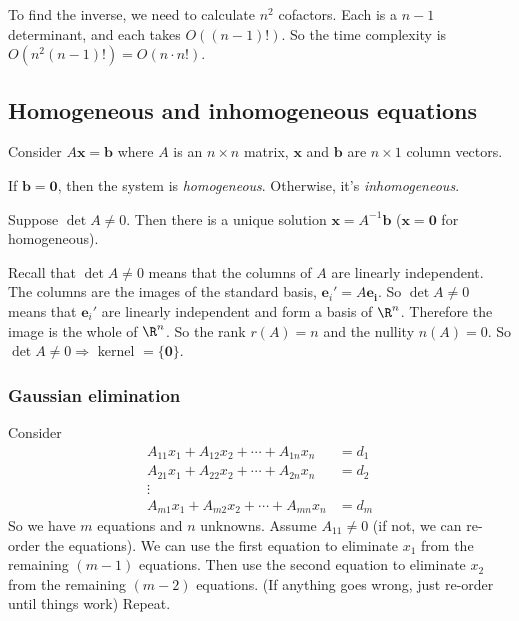 \documentclass[a4paper]{article}
\begin{document}
To find the inverse, we need to calculate $n^2$ cofactors. Each is a $n -1$ determinant, and each takes $O((n - 1)!)$. So the time complexity is $O(n^2 (n - 1)!) = O(n\cdot n!)$.

\subsection{Homogeneous and inhomogeneous equations}
Consider $A\mathbf{x} = \mathbf{b}$ where $A$ is an $n\times n$ matrix, $\mathbf{x}$ and $\mathbf{b}$ are $n\times 1$ column vectors.
\begin{defi}
  If $\mathbf{b} = \mathbf{0}$, then the system is \emph{homogeneous}. Otherwise, it's \emph{inhomogeneous}.
\end{defi}

Suppose $\det A\not= 0$. Then there is a unique solution $\mathbf{x} = A^{-1}\mathbf{b}$ ($\mathbf{x} = \mathbf{0}$ for homogeneous).

\note Recall that $\det A\not= 0$ means that the columns of $A$ are linearly independent. The columns are the images of the standard basis, $\mathbf{e}_i' = A\mathbf{e_i}$. So $\det A\not = 0$ means that $\mathbf{e}_i'$ are linearly independent and form a basis of $\R^n$. Therefore the image is the whole of $\R^n$. So the rank $r(A) = n$ and the nullity $n(A) = 0$. So $\det A\not= 0\Rightarrow$ kernel $= \{\mathbf{0}\}$.

\subsubsection{Gaussian elimination}
Consider
\begin{align*}
  A_{11}x_1 + A_{12}x_2 + \cdots + A_{1n}x_n &= d_1\\
  A_{21}x_1 + A_{22}x_2 + \cdots + A_{2n}x_n &= d_2\\
  \vdots&\\
  A_{m1}x_1 + A_{m2}x_2 + \cdots + A_{mn}x_n &= d_m
\end{align*}
So we have $m$ equations and $n$ unknowns.
Assume $A_{11}\not=0$ (if not, we can re-order the equations). We can use the first equation to eliminate $x_1$ from the remaining $(m - 1)$ equations. Then use the second equation to eliminate $x_2$ from the remaining $(m - 2)$ equations. (If anything goes wrong, just re-order until things work) Repeat.
\end{document}
